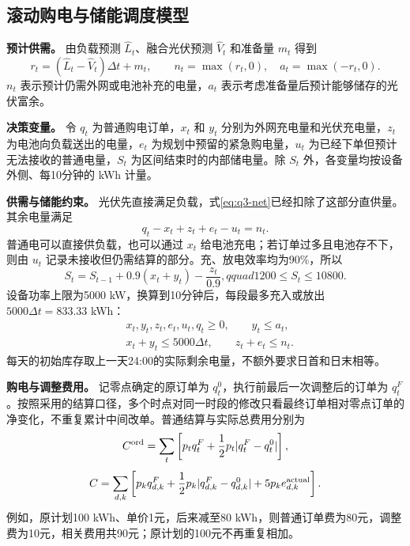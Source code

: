 \subsection{滚动购电与储能调度模型}

\textbf{预计供需。} 由负载预测 $\widehat L_t$、融合光伏预测 $\widehat V_t$ 和准备量 $m_t$ 得到
\begin{equation}
r_t=(\widehat L_t-\widehat V_t)\Delta t+m_t,\qquad
n_t=\max(r_t,0),\quad a_t=\max(-r_t,0).
\label{eq:q3-net}
\end{equation}
$n_t$ 表示预计仍需外网或电池补充的电量，$a_t$ 表示考虑准备量后预计能够储存的光伏富余。

\textbf{决策变量。} 令 $q_t$ 为普通购电订单，$x_t$ 和 $y_t$ 分别为外网充电量和光伏充电量，$z_t$ 为电池向负载送出的电量，$e_t$ 为规划中预留的紧急购电量，$u_t$ 为已经下单但预计无法接收的普通电量，$S_t$ 为区间结束时的内部储电量。除 $S_t$ 外，各变量均按设备外侧、每10分钟的 kWh 计量。

\textbf{供需与储能约束。} 光伏先直接满足负载，式\eqref{eq:q3-net}已经扣除了这部分直供量。其余电量满足
\begin{equation}
q_t-x_t+z_t+e_t-u_t=n_t.
\label{eq:q3-balance}
\end{equation}
普通电可以直接供负载，也可以通过 $x_t$ 给电池充电；若订单过多且电池存不下，则由 $u_t$ 记录未接收但仍需结算的部分。充、放电效率均为90\%，所以
\begin{equation}
S_t=S_{t-1}+0.9(x_t+y_t)-\frac{z_t}{0.9},qquad
1200\le S_t\le10800.
\label{eq:q3-storage}
\end{equation}
设备功率上限为5000 kW，换算到10分钟后，每段最多充入或放出 $5000\Delta t=833.33$ kWh：
\begin{equation}
\begin{aligned}
&x_t,y_t,z_t,e_t,u_t,q_t\ge0,\qquad y_t\le a_t,\\
&x_t+y_t\le5000\Delta t,\qquad z_t+e_t\le n_t.
\end{aligned}
\label{eq:q3-bounds}
\end{equation}
每天的初始库存取上一天24:00的实际剩余电量，不额外要求日首和日末相等。

\textbf{购电与调整费用。} 记零点确定的原订单为 $q_t^0$，执行前最后一次调整后的订单为 $q_t^F$。按照采用的结算口径，多个时点对同一时段的修改只看最终订单相对零点订单的净变化，不重复累计中间改单。普通结算与实际总费用分别为
\begin{equation}
C^{\rm ord}=\sum_t\left[p_tq_t^F+\frac12p_t|q_t^F-q_t^0|\right],
\label{eq:q3-ordinary}
\end{equation}
\begin{equation}
C=\sum_{d,k}\left[p_kq_{d,k}^F+\frac12p_k|q_{d,k}^F-q_{d,k}^0|
+5p_ke^{\rm actual}_{d,k}\right].
\label{eq:q3-bill}
\end{equation}
例如，原计划100 kWh、单价1元，后来减至80 kWh，则普通订单费为80元，调整费为10元，相关费用共90元；原计划的100元不再重复相加。

